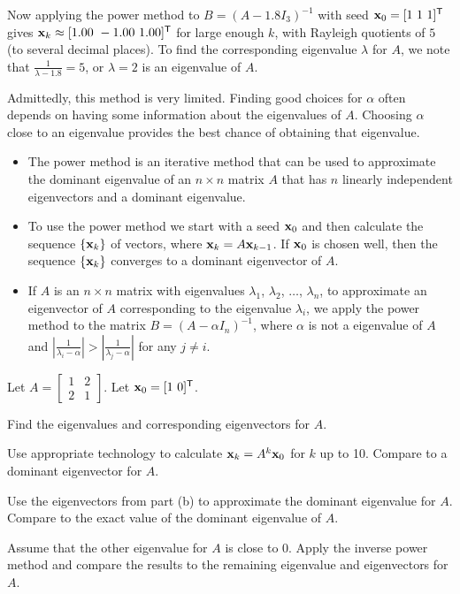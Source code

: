 \begin{example}
Now applying the power method to $B = (A-1.8I_3)^{-1}$ with seed $\mathbf{x}_0 = [1 \ 1 \ 1]^{\mathsf{T}}$ gives $\vx_k \approx [ 1.00 \ -1.00 \ 1.00]^{\tr}$ for large enough $k$, with Rayleigh quotients of $5$ (to several decimal places). To find the corresponding eigenvalue $\lambda$ for $A$, we note that $\frac{1}{\lambda-1.8} = 5$, or  $\lambda = 2$ is an eigenvalue of $A$.  

Admittedly, this method is very limited. Finding good choices for $\alpha$ often depends on having some information about the eigenvalues of $A$. Choosing $\alpha$ close to an eigenvalue provides the best chance of obtaining that eigenvalue.   

\ea

\end{example}


\label{sec:app_eigen_summ}
\begin{itemize}
\item The power method is an iterative method that can be used to approximate the dominant eigenvalue of an $n \times n$ matrix $A$ that has $n$ linearly independent eigenvectors and a dominant eigenvalue. 
\item To use the power method we start with a seed $\mathbf{x}_0$ and then calculate the sequence $\{\mathbf{x}_k\}$ of vectors, where $\mathbf{x}_k = A \mathbf{x}_{k-1}$. If $\mathbf{x}_0$ is chosen well, then the sequence $\{\mathbf{x}_k\}$ converges to a dominant eigenvector of $A$. 
\item If $A$ is an $n \times n$ matrix with eigenvalues $\lambda_1$, $\lambda_2$, $\ldots$, $\lambda_n$, to approximate an eigenvector of $A$ corresponding to the eigenvalue $\lambda_i$, we apply the power method to the matrix $B = (A - \alpha I_n)^{-1}$, where $\alpha$ is not a eigenvalue of $A$ and $\left| \frac{1}{\lambda_i - \alpha} \right| > \left| \frac{1}{\lambda_j - \alpha} \right|$ for any $j \neq i$. 
\end{itemize}

\label{sec:app_eigen_exer}

\be
\item Let $A = \left[ \begin{array}{cc} 1&2\\2&1 \end{array} \right]$. Let $\mathbf{x}_0 = [1 \ 0]^{\mathsf{T}}$. 
	\ba
	\item Find the eigenvalues and corresponding eigenvectors for $A$. 
	\item Use appropriate technology to calculate $\mathbf{x}_k = A^k \mathbf{x}_0$ for $k$ up to 10. Compare to a dominant eigenvector for $A$. 
	\item Use the eigenvectors from part (b) to approximate the dominant eigenvalue for $A$. Compare to the exact value of the dominant eigenvalue of $A$. 
	\item Assume that the other eigenvalue for $A$ is close to $0$. Apply the inverse power method and compare the results to the remaining eigenvalue and eigenvectors for $A$.
	\ea

